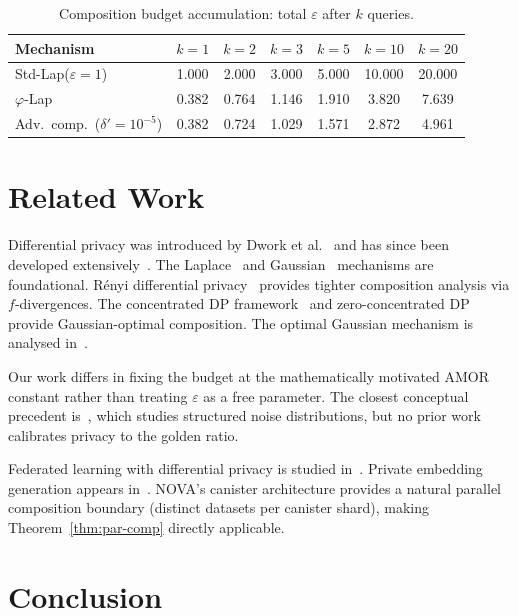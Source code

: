 \documentclass[12pt]{article}
\newcommand{\eps}{\varepsilon}
\begin{document}
\begin{table}[h]
\centering
\caption{Composition budget accumulation: total $\eps$ after $k$ queries.}
\label{tab:composition}
\begin{tabular}{@{}lcccccc@{}}
\toprule
\textbf{Mechanism} & $k=1$ & $k=2$ & $k=3$ & $k=5$ & $k=10$ & $k=20$ \\
\midrule
Std-Lap($\eps=1$)  & 1.000 & 2.000 & 3.000 & 5.000 & 10.000 & 20.000 \\
$\varphi$-Lap      & 0.382 & 0.764 & 1.146 & 1.910 & 3.820  & 7.639  \\
Adv.\ comp.\ ($\delta'=10^{-5}$) & 0.382 & 0.724 & 1.029 & 1.571 & 2.872 & 4.961 \\
\bottomrule
\end{tabular}
\end{table}

\section{Related Work}
\label{sec:related}

Differential privacy was introduced by Dwork et al.~\cite{Dwork2006} and has
since been developed extensively~\cite{Dwork2014}.  The Laplace~\cite{Dwork2006}
and Gaussian~\cite{Dwork2014} mechanisms are foundational.  Rényi differential
privacy~\cite{Mironov2017} provides tighter composition analysis via
$f$-divergences.  The concentrated DP framework~\cite{Bun2016} and
zero-concentrated DP~\cite{Bun2016zCDP} provide Gaussian-optimal composition.
The optimal Gaussian mechanism is analysed in~\cite{Balle2018}.

Our work differs in fixing the budget at the mathematically motivated AMOR
constant rather than treating $\eps$ as a free parameter.  The closest
conceptual precedent is~\cite{Ghazi2021}, which studies structured noise
distributions, but no prior work calibrates privacy to the golden ratio.

Federated learning with differential privacy is studied
in~\cite{McMahan2018,Geyer2017}.  Private embedding generation appears
in~\cite{Feyisetan2020}.  NOVA's canister architecture provides a natural
parallel composition boundary (distinct datasets per canister shard), making
Theorem~\ref{thm:par-comp} directly applicable.

\section{Conclusion}
\label{sec:conclusion}
\end{document}
